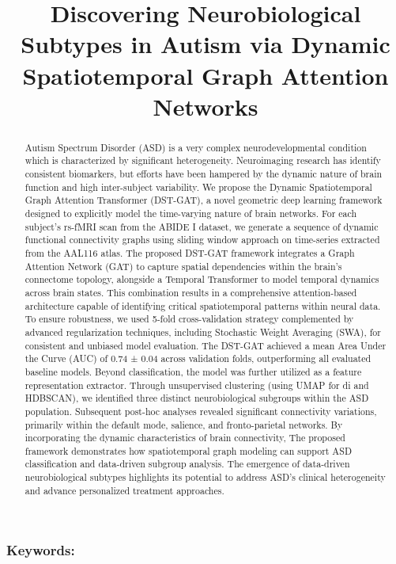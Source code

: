 \documentclass[10pt]{article}
\title{Discovering Neurobiological Subtypes in Autism via Dynamic Spatiotemporal Graph Attention Networks}
\date{}
\begin{document}
\maketitle
\begin{abstract}
Autism Spectrum Disorder (ASD) is a very complex  neurodevelopmental condition which is characterized by significant heterogeneity. Neuroimaging research has identify consistent biomarkers, but efforts have been hampered by the dynamic nature of brain function and high inter-subject variability. We propose the Dynamic Spatiotemporal Graph Attention Transformer (DST-GAT), a novel geometric deep learning framework designed to explicitly model the time-varying nature of brain networks. For each subject's rs-fMRI scan from the ABIDE I dataset, we generate a sequence of dynamic functional connectivity graphs using sliding window approach on time-series extracted from the AAL116 atlas. The proposed DST-GAT framework integrates a Graph Attention Network (GAT) to capture spatial dependencies within the brain's connectome topology, alongside a Temporal Transformer to model temporal dynamics across brain states. This combination results in a comprehensive attention-based architecture capable of identifying critical spatiotemporal patterns within neural data. To ensure robustness, we used 5-fold cross-validation strategy complemented by advanced regularization techniques, including Stochastic Weight Averaging (SWA), for consistent and unbiased model evaluation. The DST-GAT achieved a mean Area Under the Curve (AUC) of 0.74 ± 0.04 across validation folds, outperforming all evaluated baseline models. Beyond classification, the model was further utilized as a feature representation extractor. Through unsupervised clustering (using UMAP for di and HDBSCAN), we identified three distinct neurobiological subgroups within the ASD population. Subsequent post-hoc analyses revealed significant connectivity variations, primarily within the default mode, salience, and fronto-parietal networks. By incorporating the dynamic characteristics of brain connectivity, The proposed framework demonstrates how spatiotemporal graph modeling can support ASD classification and data-driven subgroup analysis. The emergence of data-driven neurobiological subtypes highlights its potential to address ASD's clinical heterogeneity and advance personalized treatment approaches. 
\end{abstract}

\subsubsection*{Keywords:}
\end{document}
